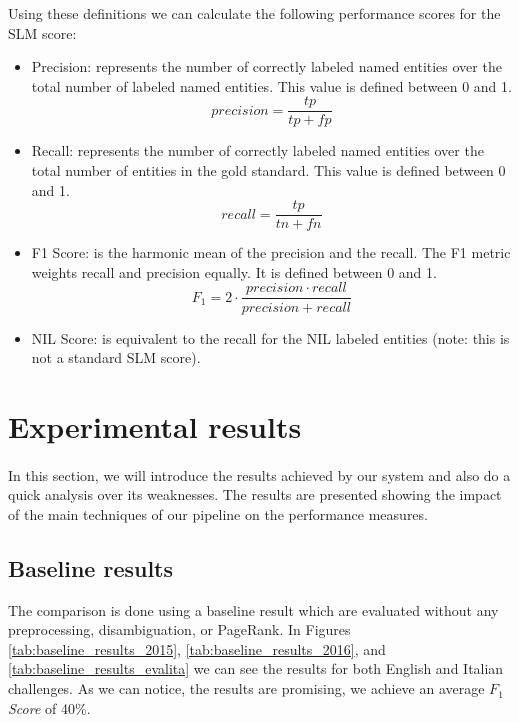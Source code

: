 Using these definitions we can calculate the following performance scores for the SLM score:
\begin{itemize}[itemsep = 0.1em]
\item Precision: represents the number of correctly labeled named entities over the total number of labeled named entities. This value is defined between 0 and 1.
\begin{equation}
precision = \frac{tp}{tp+fp}
\end{equation}

\item Recall: represents the number of correctly labeled named entities over the total number of entities in the gold standard. This value is defined between 0 and 1.
\begin{equation}
recall = \frac{tp}{tn+fn}
\end{equation}
\item F1 Score: is the harmonic mean of the precision and the recall. The F1 metric weights recall and precision equally. It is defined between 0 and 1. 
\begin{equation}
F_1 = 2 \cdot \frac{precision \cdot recall}{precision+recall}
\end{equation}
\item NIL Score: is equivalent to the recall for the NIL labeled entities (note: this is not a standard SLM score).
\end{itemize}	


\section{Experimental results}
\paragraph{} In this section, we will introduce the results achieved by our system and also do a quick analysis over its weaknesses. The results are presented showing the impact of the main techniques of our pipeline on the performance measures. 


\subsection{Baseline results}
The comparison is done using a baseline result which are evaluated without any preprocessing, disambiguation, or PageRank. In Figures \ref{tab:baseline_results_2015}, \ref{tab:baseline_results_2016}, and \ref{tab:baseline_results_evalita} we can see the results for both English and Italian challenges. As we can notice, the results are promising, we achieve an average \(F_1\) \textit{Score} of 40\%. 

